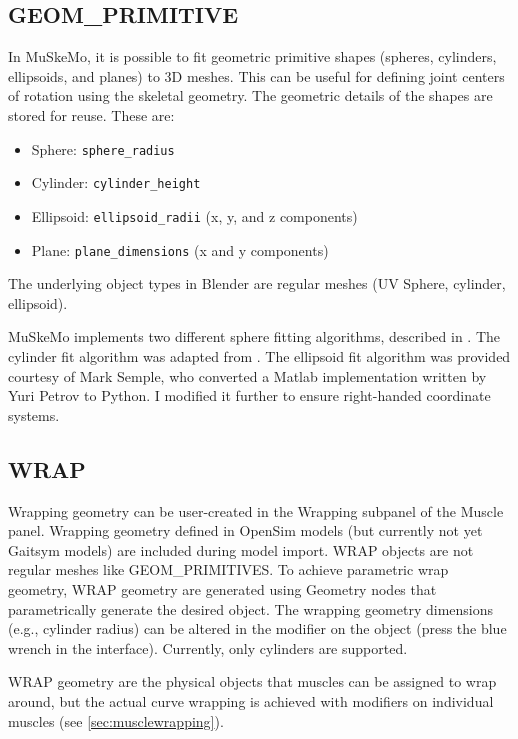 \documentclass{article}
\begin{document}
\subsection{GEOM\_PRIMITIVE}

In MuSkeMo, it is possible to fit geometric primitive shapes (spheres, cylinders, ellipsoids, and planes) to 3D meshes. This can be useful for defining joint centers of rotation using the skeletal geometry. The geometric details of the shapes are stored for reuse. These are:

\begin{itemize}
    \item Sphere: \texttt{sphere\_radius}
    \item Cylinder: \texttt{cylinder\_height}
    \item Ellipsoid: \texttt{ellipsoid\_radii} (x, y, and z components)
    \item Plane: \texttt{plane\_dimensions} (x and y components)
\end{itemize}

The underlying object types in Blender are regular meshes (UV Sphere, cylinder, ellipsoid).

MuSkeMo implements two different sphere fitting algorithms, described in \cite{Jekel2016, yesudasanFastGeometricFit2015}. The cylinder fit algorithm was adapted from \cite{eberlyLeastSquaresFitting}. The ellipsoid fit algorithm \cite{semplePyEllipsoid_Fit} was provided courtesy of Mark Semple, who converted a Matlab implementation written by Yuri Petrov to Python. I modified it further to ensure right-handed coordinate systems.

\subsection{WRAP}
\label{sec:wrapgeom}

Wrapping geometry can be user-created in the Wrapping subpanel of the Muscle panel. Wrapping geometry defined in OpenSim models (but currently not yet Gaitsym models) are included during model import. WRAP objects are not regular meshes like GEOM\_PRIMITIVES. To achieve parametric wrap geometry, WRAP geometry are generated using Geometry nodes that parametrically generate the desired object. The wrapping geometry dimensions (e.g., cylinder radius) can be altered in the modifier on the object (press the blue wrench in the interface). Currently, only cylinders are supported.

WRAP geometry are the physical objects that muscles can be assigned to wrap around, but the actual curve wrapping is achieved with modifiers on individual muscles (see \ref{sec:musclewrapping}).
\end{document}
